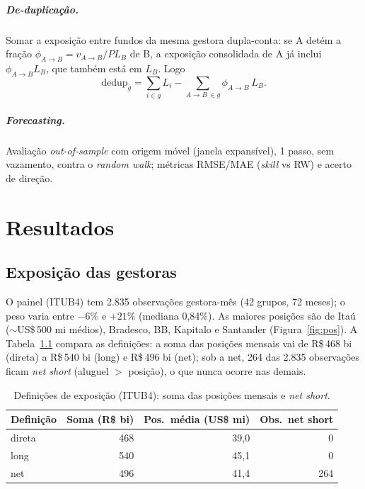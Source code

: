 \documentclass[12pt,a4paper]{report}
\begin{document}
\paragraph{De-duplicação.} Somar a exposição entre fundos da mesma gestora dupla-conta: se A detém a fração
$\phi_{A\to B}=v_{A\to B}/PL_B$ de B, a exposição consolidada de A já inclui $\phi_{A\to B}L_B$, que também
está em $L_B$. Logo
\[ \text{dedup}_g = \sum_{i\in g} L_i - \!\!\sum_{A\to B\,\in g}\!\! \phi_{A\to B}\,L_B . \]

\paragraph{Forecasting.} Avaliação \emph{out-of-sample} com origem móvel (janela expansível), 1 passo, sem
vazamento, contra o \emph{random walk}; métricas RMSE/MAE (\emph{skill} vs RW) e acerto de direção.

\chapter{Resultados}\label{cap:result}

\section{Exposição das gestoras}\label{sec:exp}
O painel (ITUB4) tem 2.835 observações gestora-mês (42 grupos, 72 meses); o peso varia entre $-6\%$ e
$+21\%$ (mediana 0,84\%). As maiores posições são de Itaú ($\sim$US\$\,500 mi médios), Bradesco, BB,
Kapitalo e Santander (Figura~\ref{fig:pos}). A Tabela~\ref{tab:expo} compara as definições: a soma das
posições mensais vai de R\$\,468 bi (direta) a R\$\,540 bi (long) e R\$\,496 bi (net); sob a net, 264 das
2.835 observações ficam \emph{net short} (aluguel $>$ posição), o que nunca ocorre nas demais.

\begin{table}[H]\centering
\caption{Definições de exposição (ITUB4): soma das posições mensais e \emph{net short}.}
\label{tab:expo}
\small
\begin{tabular}{lrrr}
\toprule
\textbf{Definição} & \textbf{Soma (R\$ bi)} & \textbf{Pos.\ média (US\$ mi)} & \textbf{Obs.\ net short} \\
\midrule
direta & 468 & 39,0 & 0 \\
long   & 540 & 45,1 & 0 \\
net    & 496 & 41,4 & 264 \\
\bottomrule
\end{tabular}
\end{table}
\end{document}
